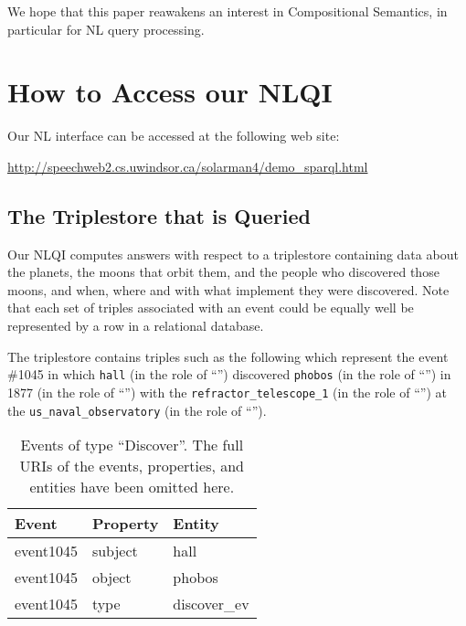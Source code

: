 \documentclass[../main.tex]{subfiles}
\begin{document}
\begin{refsection}
We hope that this paper reawakens an interest in Compositional Semantics, in particular for NL query processing.

\section{How to Access our NLQI}
\label{webist2019conf:access}

Our NL interface can be accessed at the following web site:

\begin{center}
	\url{http://speechweb2.cs.uwindsor.ca/solarman4/demo_sparql.html}
\end{center}

\subsection{The Triplestore that is Queried}
\label{webist2019conf:triplestore}
Our NLQI computes answers with respect to a triplestore containing data about the planets, the moons that orbit them, and the people who discovered those moons, and when, where and with what implement they were discovered. Note that each set of triples associated with an event could be equally well be represented by a row in a relational database.

The triplestore contains triples such as the following which represent the event \#1045 in which \texttt{hall} (in the role of ``'') discovered \texttt{phobos} (in the role of ``'') in 1877 (in the role of ``'') with the \texttt{refractor\_telescope\_1} (in the role of ``'')  at the \texttt{us\_naval\_observatory} (in the role of ``'').

\begin{table}[h]
	\caption[Events of type ``Discover''.]{Events of type ``Discover''. The full URIs of the events, properties, and entities have been omitted here.}
	\label{webist2019conf:evdiscover}
	\centering
	\begin{tabular}{lll}
		\toprule
		Event & Property & Entity \\
		\midrule
		event1045 &
		subject &
		hall \\

		event1045 &
		object &
		phobos \\

		event1045 &
		type &
		discover\_ev \\


\end{tabular}
\end{table}
\end{refsection}
\end{document}
